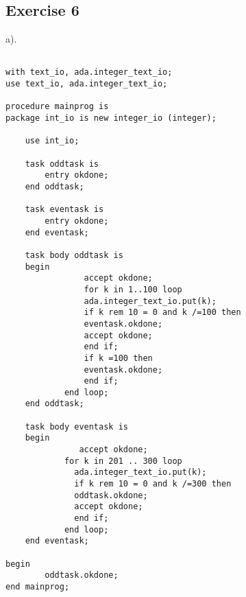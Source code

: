 \documentclass[12pt]{article}
\begin{document}
\subsection*{Exercise 6}
a).
\begin{lstlisting}
    
with text_io, ada.integer_text_io;
use text_io, ada.integer_text_io;

procedure mainprog is
package int_io is new integer_io (integer);

    use int_io;

    task oddtask is
        entry okdone;
    end oddtask;

    task eventask is
        entry okdone;
    end eventask;

    task body oddtask is
    begin
                accept okdone;
                for k in 1..100 loop
                ada.integer_text_io.put(k);
                if k rem 10 = 0 and k /=100 then
                eventask.okdone;
                accept okdone;
                end if;
                if k =100 then
                eventask.okdone;
                end if;
            end loop;
    end oddtask;

    task body eventask is
    begin
               accept okdone;
            for k in 201 .. 300 loop
              ada.integer_text_io.put(k);
              if k rem 10 = 0 and k /=300 then
              oddtask.okdone;
              accept okdone;
              end if;
            end loop;
    end eventask;

begin
        oddtask.okdone;
end mainprog;

\end{lstlisting}
\vspace{2in} %
\end{document}
